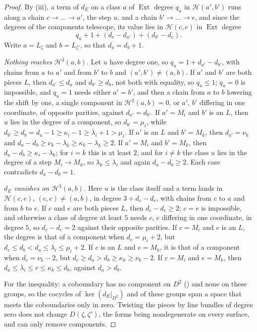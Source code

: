 \documentclass[11pt,reqno]{amsart}
\theoremstyle{plain}
\theoremstyle{definition}
\theoremstyle{remark}
\newcommand{\cH}{\mathcal{H}}
\DeclareMathOperator{\Ext}{Ext}
\begin{document}
\begin{proof}
By (iii), a term of $d_{E}$ on a class $u$ of $\Ext$
degree $q_{u}$ in $\cH(a',b')$ runs along a chain $c\to\dots\to a'$, the
step $u$, and a chain $b'\to\dots\to e$, and since the degrees of the
components telescope, its value lies in $\cH(c,e)$ in $\Ext$ degree
\[
  q_{u}+1+(d_{c}-d_{a'})+(d_{b'}-d_{e}).
\]
Write $a=L_{\zeta}$ and $b=L_{\zeta'}$, so that $d_{a}=d_{b}+1$.

\emph{Nothing reaches $\cH^{3}(a,b)$.} Let $u$ have degree one, so
$q_{u}=1+d_{a'}-d_{b'}$, with chains from $a$ to $a'$ and from $b'$ to $b$
and $(a',b')\ne(a,b)$. If $a'$ and $b'$ are both pieces $L$, then
$d_{a'}\le d_{a}$ and $d_{b'}\ge d_{b}$, not both with equality, so
$q_{u}\le1$; $q_{u}=0$ is impossible, and $q_{u}=1$ needs either $a'=b'$, and
then a chain from $a$ to $b$ lowering the shift by one, a single component in
$\cH^{2}(a,b)=0$, or $a'$, $b'$ differing in one coordinate, of opposite
parities, against $d_{a'}=d_{b'}$. If $a'=M_{i}$ and $b'$ is an $L$, then
$u$ lies in the degree of a component, so $d_{b'}=\mu_{i}$, while
$d_{b'}\ge d_{b}=d_{a}-1\ge\kappa_{i}-1\ge\lambda_{i}+1>\mu_{i}$. If $a'$ is
an $L$ and $b'=M_{k}$, then $d_{a'}=\nu_{k}$ and
$d_{a}-d_{b}\ge\nu_{k}-\lambda_{k}\ge\kappa_{k}-\lambda_{k}\ge2$. If
$a'=M_{i}$ and $b'=M_{k}$, then $d_{a}-d_{b}\ge\kappa_{i}-\lambda_{k}$; for
$i=k$ this is at least $2$, and for $i\ne k$ the class $u$ lies in the
degree of a step $M_{i}\to M_{k}$, so $\lambda_{k}\le\lambda_{i}$ and again
$d_{a}-d_{b}\ge2$. Each case contradicts $d_{a}-d_{b}=1$.

\emph{$d_{E}$ vanishes on $\cH^{3}(a,b)$.} Here $u$ is the class itself and a
term lands in $\cH(c,e)$, $(c,e)\ne(a,b)$, in degree $3+d_{c}-d_{e}$, with
chains from $c$ to $a$ and from $b$ to $e$. If $c$ and $e$ are both pieces
$L$, then $d_{c}-d_{e}\ge2$; $c=e$ is impossible, and otherwise a class of
degree at least $5$ needs $c$, $e$ differing in one coordinate, in degree
$5$, so $d_{c}-d_{e}=2$ against their opposite parities. If $c=M_{i}$ and
$e$ is an $L$, the degree is that of a component when $d_{e}=\mu_{i}+2$, but
$d_{e}\le d_{b}<d_{a}\le\lambda_{i}\le\mu_{i}+2$. If $c$ is an $L$ and
$e=M_{k}$, it is that of a component when $d_{c}=\nu_{k}-2$, but
$d_{c}\ge d_{a}>d_{b}\ge\kappa_{k}\ge\nu_{k}-2$. If $c=M_{i}$ and
$e=M_{k}$, then $d_{a}\le\lambda_{i}\le r\le\kappa_{k}\le d_{b}$, against
$d_{a}>d_{b}$.

For the inequality: a coboundary has no component on $D^{2}$
() and none on these groups, so the cocycles of
$\ker(d_{E}|_{D^{2}})$ and of these groups span a space that meets the
coboundaries only in zero. Twisting the pieces by line bundles of degree
zero does not change $D(\zeta,\zeta')$, the forms being nondegenerate on
every surface, and can only remove components.
\end{proof}
\end{document}
